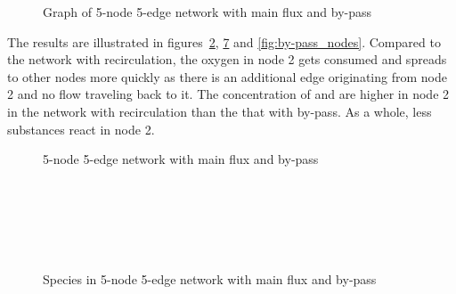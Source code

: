 \begin{figure}[htbp]
    \centering
{}
\caption{Graph of 5-node 5-edge network with main flux and by-pass}
\label{fig:by-pass}
\end{figure}

The results are illustrated in figures~\ref{fig:by-pass_}, \ref{fig:by-pass_species} and \ref{fig:by-pass_nodes}. Compared to the network with recirculation, the oxygen in node 2 gets consumed and spreads to other nodes more quickly as there is an additional edge originating from node 2 and no flow traveling back to it. The concentration of  and  are higher in node 2 in the network with recirculation than the that with by-pass. As a whole, less substances react in node 2. 

\begin{figure}[htbp]
    \centering
    
    \caption{5-node 5-edge network with main flux and by-pass}
    \label{fig:by-pass_}
\end{figure}

\begin{figure}[htbp]
    \centering
    \begin{subfigure}[b]{0.48\textwidth}
        
        \caption{}
        \label{fig:by-passCH4}
    \end{subfigure}
    ~
    \begin{subfigure}[b]{0.48\textwidth}
        
        \caption{}
        \label{fig:by-passO2}
    \end{subfigure}
    ~
    \begin{subfigure}[b]{0.48\textwidth}
        
        \caption{}
        \label{fig:by-passCO2}
    \end{subfigure}
    ~
    \begin{subfigure}[b]{0.48\textwidth}
        
        \caption{}
        \label{fig:by-passH2O}
    \end{subfigure}
    \caption{Species in 5-node 5-edge network with main flux and by-pass}\label{fig:by-pass_species}
\end{figure}

